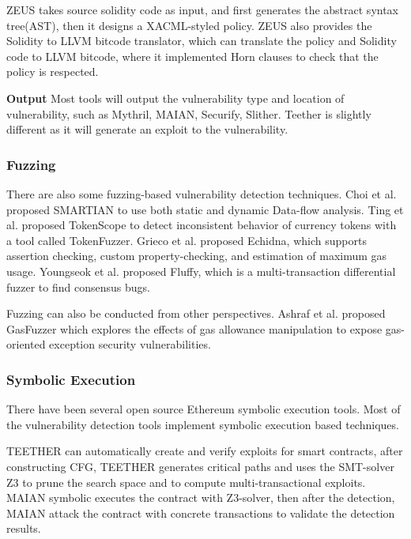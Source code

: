 \documentclass[sigplan,screen]{acmart}
\begin{document}
ZEUS\cite{kalra2018zeus} takes source solidity code as input, and first generates the abstract syntax tree(AST), then it designs a XACML-styled policy. ZEUS also provides the Solidity to LLVM bitcode translator, which can translate the policy and Solidity code to LLVM bitcode, where it implemented Horn clauses to check that the policy is respected.
 
 \textbf{Output}
 Most tools will output the vulnerability type and location of vulnerability, such as Mythril\cite{mythril}, MAIAN\cite{nikolic2018finding}, Securify\cite{tsankov2018securify}, Slither\cite{feist2019slither}. Teether\cite{krupp2018teether} is slightly different as it will generate an exploit to the vulnerability.


\subsubsection{Fuzzing}

There are also some fuzzing-based vulnerability detection techniques. 
Choi et al. \cite{choi2021smartian} proposed SMARTIAN to use both static and dynamic Data-flow analysis. Ting et al.\cite{chen2019tokenscope} proposed TokenScope to detect inconsistent behavior of currency tokens with a tool called TokenFuzzer.
Grieco et al.\cite{grieco2020echidna} proposed Echidna, which supports assertion checking, custom property-checking, and estimation of maximum gas usage.
Youngseok et al. \cite{yang2021finding} proposed Fluffy, which is a multi-transaction differential fuzzer to find consensus bugs.

Fuzzing can also be conducted from other perspectives. Ashraf et al. \cite{ashraf2020gasfuzzer} proposed GasFuzzer which explores the effects of gas allowance manipulation to expose gas-oriented exception security vulnerabilities. 
\subsubsection{Symbolic Execution}

There have been several open source Ethereum symbolic execution tools. Most of the vulnerability detection tools implement symbolic execution based techniques.

TEETHER \cite{krupp2018teether} can automatically create and verify exploits for smart contracts, after constructing CFG, TEETHER generates critical paths and uses the SMT-solver Z3 to prune the search space and to compute multi-transactional exploits. MAIAN\cite{nikolic2018finding} symbolic executes the contract with Z3-solver, then after the detection, MAIAN attack the contract with concrete transactions to validate the detection results.
\end{document}
